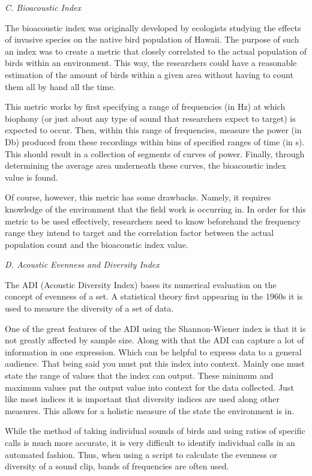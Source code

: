 \begin{flushleft}
\noindent\textit{C. Bioacoustic Index}\par
The bioacoustic index was originally developed by ecologists studying the effects of invasive species on the native bird population of Hawaii. The purpose of such an index was to create a metric that closely correlated to the actual population of birds within an environment. This way, the researchers could have a reasonable estimation of the amount of birds within a given area without having to count them all by hand all the time.\par
This metric works by first specifying a range of frequencies (in Hz) at which biophony (or just about any type of sound that researchers expect to target) is expected to occur. Then, within this range of frequencies, measure the power (in Db) produced from these recordings within bins of specified ranges of time (in s). This should result in a collection of segments of curves of power. Finally, through determining the average area underneath these curves, the bioacoustic index value is found.\par
Of course, however, this metric has some drawbacks. Namely, it requires knowledge of the environment that the field work is occurring in. In order for this metric to be used effectively, researchers need to know beforehand the frequency range they intend to target and the correlation factor between the actual population count and the bioacoustic index value.\par

\noindent\textit{D. Acoustic Evenness and Diversity Index}\par
The ADI (Acoustic Diversity Index) bases its numerical evaluation on the concept of evenness of a set. A statistical theory first appearing in the 1960\textquotesingle s it is used to measure the diversity of a set of data.\par
One of the great features of the ADI using the Shannon-Wiener index is that it is not greatly affected by sample size. Along with that the ADI can capture a lot of information in one expression. Which can be helpful to express data to a general audience. That being said you must put this index into context. Mainly one must state the range of values that the index can output. These minimum and maximum values put the output value into context for the data collected. Just like most indices it is important that diversity indices are used along other measures. This allows for a holistic measure of the state the environment is in.\cite{shannonWiener}\par
While the method of taking individual sounds of birds and using ratios of specific calls is much more accurate, it is very difficult to identify individual calls in an automated fashion. Thus, when using a script to calculate the evenness or diversity of a sound clip, bands of frequencies are often used.

\end{flushleft}
